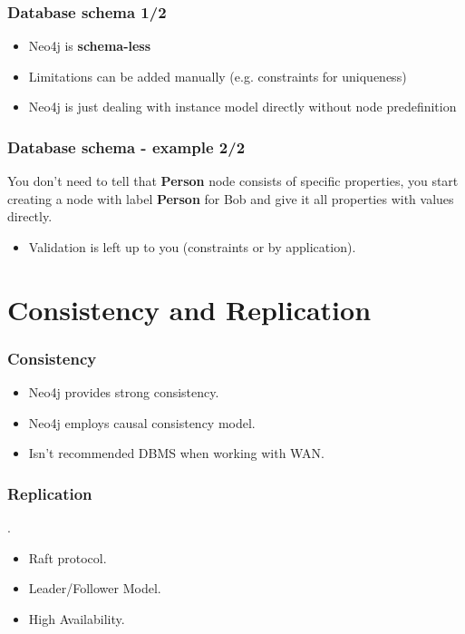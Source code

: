 \documentclass[aspectratio=169]{beamer}
\begin{document}
\begin{frame}
    \frametitle{Database schema 1/2}
    \begin{itemize}
    	\item Neo4j is \textbf{schema-less}
    	\item Limitations can be added manually (e.g. constraints for uniqueness)
    	\item Neo4j is just dealing with instance model directly without node predefinition 
    \end{itemize}
\end{frame}

\begin{frame}
    \frametitle{Database schema - example 2/2}
    You don't need to tell that \textbf{Person} node consists of specific properties, you start creating a node with label \textbf{Person} for Bob and give it all properties with values directly.
    \newline
    \newline
    \begin{itemize}
    	\item Validation is left up to you (constraints or by application).
    \end{itemize}
\end{frame}

\section{Consistency and Replication}
\begin{frame}
    \frametitle{Consistency}
	\begin{itemize}
   		\item Neo4j provides strong consistency.
		\item Neo4j employs causal consistency model.
		\item Isn't recommended DBMS when working with WAN.
	\end{itemize}
\end{frame}

\begin{frame}
	\frametitle{Replication}.
	\begin{itemize}
		\item Raft protocol.
		\item Leader/Follower Model. \footnotemark[2]
		\item High Availability.
	\end{itemize}
\end{frame}
\end{document}
